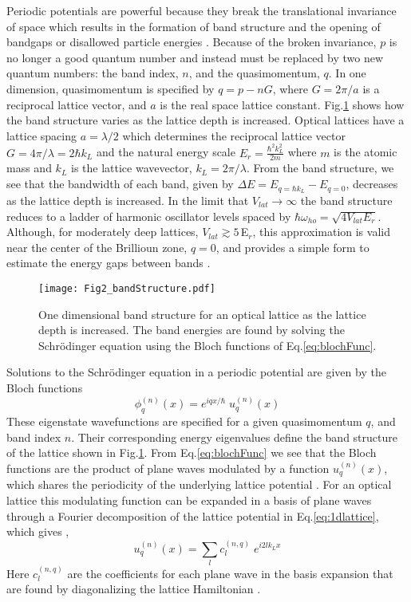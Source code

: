 Periodic potentials are powerful because they break the translational invariance of space which results in the formation of band structure and the opening of bandgaps or disallowed particle energies \cite{Ashcroft1976}. Because of the broken invariance, $p$ is no longer a good quantum number and instead must be replaced by two new quantum numbers: the band index, $n$, and the quasimomentum, $q$. In one dimension, quasimomentum is specified by $q = p - nG$, where $G=2\pi/a$ is a reciprocal lattice vector, and $a$ is the real space lattice constant. Fig.\;\ref{fig:bandStructure} shows how the band structure varies as the lattice depth is increased. Optical lattices have a lattice spacing $a = \lambda /2$ which determines the reciprocal lattice vector $G = 4\pi / \lambda = 2 \hbar k_L$ and the natural energy scale $E_r = \frac{\hbar^2 k_L^2}{2m}$ where $m$ is the atomic mass and $k_L$ is the lattice wavevector, $k_L = 2\pi / \lambda$. From the band structure, we see that the bandwidth of each band, given by $\Delta E = E_{q=\hbar k_L} - E_{q=0}$, decreases as the lattice depth is increased. In the limit that $V_{lat}\!\rightarrow\!\infty$ the band structure reduces to a ladder of harmonic oscillator levels spaced by $\hbar \omega_{ho} = \sqrt{4 V_{lat} E_r}$. Although, for moderately deep lattices, $V_{lat} \gtrsim 5\,$E$_r$, this approximation is valid near the center of the Brillioun zone, $q = 0$, and provides a simple form to estimate the energy gaps between bands \cite{Jaksch1998,Jaksch2005}.
	\begin{figure}
		\centerline{
		\texttt{[image: Fig2\_bandStructure.pdf]}}
		\caption{One dimensional band structure for an optical lattice as the lattice depth is increased. The band energies are found by solving the Schr\"{o}dinger equation using the Bloch functions of Eq.\;\ref{eq:blochFunc}.}
		\label{fig:bandStructure}
	\end{figure}
	 
Solutions to the Schr\"{o}dinger equation in a periodic potential are given by the Bloch functions \cite{Ashcroft1976}
	\begin{equation} \label{eq:blochFunc}
		 \phi_q^{(n)}(x) = e^{iqx/ \hbar} \; u_q^{(n)}(x)
	\end{equation}
These eigenstate wavefunctions are specified for a given quasimomentum $q$, and band index $n$. Their corresponding energy eigenvalues define the band structure of the lattice shown in Fig.\;\ref{fig:bandStructure}. From Eq.\;\ref{eq:blochFunc} we see that the Bloch functions are the product of plane waves modulated by a function $u_q^{(n)}(x)$, which shares the periodicity of the underlying lattice potential \cite{Ashcroft1976}. For an optical lattice this modulating function can be expanded in a basis of plane waves through a Fourier decomposition of the lattice potential in Eq.\;\ref{eq:1dlattice}, which gives \cite{Greiner2003},
	\begin{equation} \label{eq:blochMod}
		 u_q^{(n)}(x) = \sum_l c_l^{(n,q)} \; e^{i2lk_Lx}
	\end{equation}
Here $c_l^{(n,q)}$ are the coefficients for each plane wave in the basis expansion that are found by diagonalizing the lattice Hamiltonian \cite{Greiner2003}.

